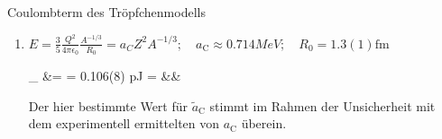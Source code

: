 \documentclass{alex_hü}
\begin{document}
\renewcommand{\labelenumi}{\alph{enumi})}


\begin{mybox}{Coulombterm des Tröpfchenmodells}
	\begin{enumerate}
		\item \( E = \tfrac{3}{5}\tfrac{Q^2}{4\pi\epsilon_0}\tfrac{A^{-1/3}}{R_0} = a_CZ^2 A^{-1/3};\quad a_{\text{C}} \approx 0.714 \unit{MeV};\quad R_0 = 1.3(1) \unit{\femto\meter} \)
		\begin{flalign*}
			_{} &= 
				= 0.106(8) \unit{\pico\joule} 
				=  &&\\
		\end{flalign*}
		Der hier bestimmte Wert für \( \tilde{a}_{\text{C}} \) stimmt im Rahmen der Unsicherheit mit dem experimentell ermittelten von \( a_{\text{C}} \) überein.
	\end{enumerate}
\end{mybox}
\end{document}
